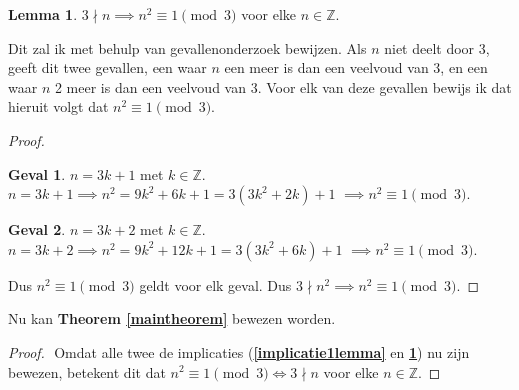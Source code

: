 \documentclass[12pt, dutch, a4paper]{article}
\theoremstyle{definition}
\newtheorem{lemma}{Lemma}[theorem]
\newtheorem{case}{Geval}
\begin{document}
\newpage
\begin{lemma} \label{implicatie2lemma}
    $3 \nmid n \implies n^2 \equiv 1 \pmod{3} $ voor elke $n \in \mathbb{Z}$. 
\end{lemma}

Dit zal ik met behulp van gevallenonderzoek bewijzen. 
Als $n$ niet deelt door 3, geeft dit twee gevallen, een waar $n$ een meer is dan 
een veelvoud van 3, en een waar $n$ 2 meer is dan een veelvoud van 3. Voor elk 
van deze gevallen bewijs ik dat hieruit volgt dat $n^2 \equiv 1 \pmod{3}$.

\begin{proof} 
    \begin{case} $n = 3k + 1$ met $k \in \mathbb{Z}$. \newline
        $n = 3k + 1 \implies n^2 = 9k^2 + 6k + 1 = 3(3k^2 + 2k) + 1$ \newline
        $\implies n^2 \equiv 1 \pmod{3}$.
    \end{case}
    \begin{case} $n = 3k + 2$ met $k \in \mathbb{Z}$. \newline
        $n = 3k + 2 \implies n^2 = 9k^2 + 12k + 1 = 3(3k^2 + 6k) + 1$ \newline
        $\implies n^2 \equiv 1 \pmod{3}$.
    \end{case}
    Dus $n^2 \equiv 1 \pmod{3}$ geldt voor elk geval. \newline
    Dus $3 \nmid n^2 \implies n^2 \equiv 1 \pmod{3}$.
\end{proof}

Nu kan \textbf{Theorem \ref{maintheorem}} bewezen worden.
\begin{proof} $ $ \newline
    Omdat alle twee de implicaties 
    (\textbf{\cref{implicatie1lemma}} en \textbf{\cref{implicatie2lemma}})
    nu zijn bewezen, betekent dit dat
    $n^2 \equiv 1 \pmod{3} \iff 3 \nmid n$ voor elke $n \in \mathbb{Z}$.
\end{proof}
\end{document}
